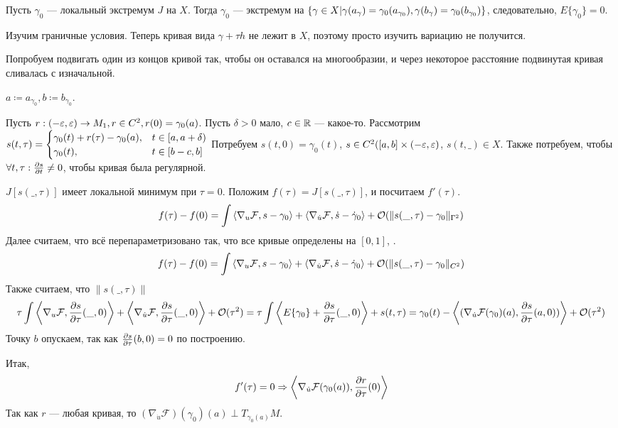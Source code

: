 \documentclass[a4paper]{article}
\begin{document}
    Пусть $\gamma_0$ --- локальный экстремум $J$ на $X$.
    Тогда $\gamma_0$ --- экстремум на $\left\{\gamma \in X\middle|\gamma(a_\gamma) = \gamma_0(a_{\gamma_0}), \gamma(b_\gamma) = \gamma_0(b_{\gamma_0})\right\}$, следовательно, $E\{\gamma_0\} = 0$.

    Изучим граничные условия.
    Теперь кривая вида $\gamma + \tau h$ не лежит в $X$, поэтому просто изучить вариацию не получится.

    Попробуем подвигать один из концов кривой так, чтобы он оставался на многообразии, и через некоторое расстояние подвинутая кривая сливалась с изначальной.

    $a \coloneqq a_{\gamma_0}, b \coloneqq b_{\gamma_0}$.

    Пусть $r: (-\varepsilon, \varepsilon) \rightarrow M_1, r \in C^2, r(0) = \gamma_0(a)$.
    Пусть $\delta > 0$ мало, $c \in \mathbb{R}$ --- какое-то.
    Рассмотрим $s(t, \tau) = \begin{cases}\gamma_0(t) + r(\tau) - \gamma_0(a), & t \in [a, a + \delta) \\ \gamma_0(t),& t \in [b - c, b]\end{cases}$
    Потребуем $s(t, 0) = \gamma_0(t)$, $s \in C^2([a, b] \times (-\varepsilon, \varepsilon)$, $s(t, \_) \in X$.
    Также потребуем, чтобы $\forall t, \tau: \frac{\partial s}{\partial t} \ne 0$, чтобы кривая была регулярной.


    $J[s(\_, \tau)]$ имеет локальной минимум при $\tau = 0$.
    Положим $f(\tau) = J[s(\_, \tau)]$, и посчитаем $f'(\tau)$.
    \[f(\tau) - f(0) = \int\left\langle\nabla_u \mathcal{F}, s - \gamma_0\right\rangle + \left\langle\nabla_{\dot{u}}\mathcal{F}, \dot{s} - \dot{\gamma}_0\right\rangle + \mathcal{O}(\|s(\_, \tau) - \gamma_0\|_{\Gamma^2})\]
    Далее считаем, что всё перепараметризовано так, что все кривые определены на $[0, 1]$, .
    \[f(\tau) - f(0) = \int\left\langle\nabla_u \mathcal{F}, s - \gamma_0\right\rangle + \left\langle\nabla_{\dot{u}}\mathcal{F}, \dot{s} - \dot{\gamma}_0\right\rangle + \mathcal{O}(\|s(\_, \tau) - \gamma_0\|_{C^2})\]
    Также считаем, что $\|s(\_, \tau)\|$ 
    \[\tau\int\left\langle\nabla_u\mathcal{F}, \frac{\partial s}{\partial \tau}(\_, 0)\right\rangle + \left\langle\nabla_{\dot{u}}\mathcal{F}, \frac{\partial s}{\partial \tau}(\_, 0)\right\rangle + \mathcal{O}(\tau^2) = \tau\int\left\langle E\{\gamma_0\} + \frac{\partial s}{\partial \tau}(\_, 0)\right\rangle + s(t, \tau) = \gamma_0(t) - \left\langle(\nabla_{\dot{u}}\mathcal{F}(\gamma_0)(a), \frac{\partial s}{\partial \tau}(a, 0))\right\rangle + \mathcal{O}(\tau^2)\]
    Точку $b$ опускаем, так как $\frac{\partial s}{\partial \tau}(b, 0) = 0$ по построению.

    Итак,
    \[f'(\tau) = 0 \Rightarrow \left\langle\nabla_{\dot{u}}\mathcal{F}(\gamma_0(a)), \frac{\partial r}{\partial \tau}(0)\right\rangle\]
    Так как $r$ --- любая кривая, то $(\nabla_{\dot{u}}\mathcal{F})(\gamma_0)(a) \perp T_{\gamma_0(a)}M$.
\end{document}
